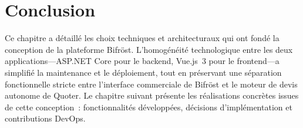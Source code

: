\section{Conclusion}

Ce chapitre a détaillé les choix techniques et architecturaux qui ont fondé la conception de la plateforme Bifröst. L'homogénéité technologique entre les deux applications---ASP.NET Core pour le backend, Vue.js~3 pour le frontend---a simplifié la maintenance et le déploiement, tout en préservant une séparation fonctionnelle stricte entre l'interface commerciale de Bifröst et le moteur de devis autonome de Quoter. Le chapitre suivant présente les réalisations concrètes issues de cette conception~: fonctionnalités développées, décisions d'implémentation et contributions DevOps.